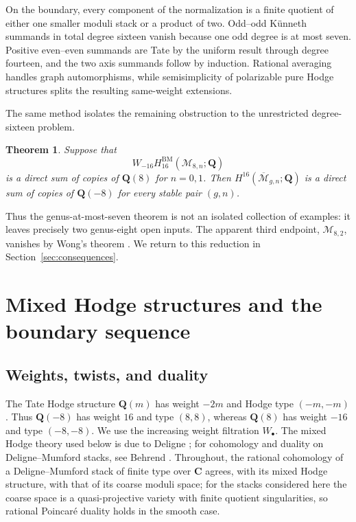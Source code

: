 \documentclass[12pt,reqno]{amsart}
\newcommand{\Q}{\mathbf{Q}}
\newcommand{\C}{\mathbf{C}}
\newcommand{\M}{\mathcal{M}}
\newcommand{\Mbar}{\overline{\mathcal{M}}}
\newcommand{\BM}{\mathrm{BM}}
\newtheorem{theorem}{Theorem}[section]
\theoremstyle{definition}
\theoremstyle{remark}
\begin{document}
On the boundary, every component of the normalization is a finite quotient
of either one smaller moduli stack or a product of two.  Odd--odd K\"unneth
summands in total degree sixteen vanish because one odd degree is at most
seven.  Positive even--even summands are Tate by the uniform result through
degree fourteen, and the two axis summands follow by induction.  Rational
averaging handles graph automorphisms, while semisimplicity of polarizable
pure Hodge structures splits the resulting same-weight extensions.

The same method isolates the remaining obstruction to the unrestricted
degree-sixteen problem.

\begin{theorem}\label{thm:reduction-intro}
Suppose that
\[
 W_{-16}H^{\BM}_{16}(\M_{8,n};\Q)
\]
is a direct sum of copies of $\Q(8)$ for $n=0,1$.  Then
$H^{16}(\Mbar_{g,n};\Q)$ is a direct sum of copies of $\Q(-8)$ for every
stable pair $(g,n)$.
\end{theorem}

Thus the genus-at-most-seven theorem is not an isolated collection of
examples: it leaves precisely two genus-eight open inputs.  The apparent
third endpoint, $\M_{8,2}$, vanishes by Wong's theorem
\cite[Theorem~4.1]{Wong}.  We return to this reduction in
Section~\ref{sec:consequences}.

\section{Mixed Hodge structures and the boundary sequence}
\label{sec:boundary}

\subsection{Weights, twists, and duality}

The Tate Hodge structure $\Q(m)$ has weight $-2m$ and Hodge type
$(-m,-m)$.  Thus $\Q(-8)$ has weight $16$ and type $(8,8)$, whereas
$\Q(8)$ has weight $-16$ and type $(-8,-8)$.  We use the increasing weight
filtration $W_\bullet$.  The mixed Hodge theory used below is due to Deligne
\cite{DeligneHodgeII,DeligneHodgeIII}; for cohomology and duality on
Deligne--Mumford stacks, see Behrend \cite{BehrendStacks}.  Throughout, the
rational cohomology of a Deligne--Mumford stack of finite type over $\C$
agrees, with its mixed Hodge structure, with that of its coarse moduli
space; for the stacks considered here the coarse space is a quasi-projective
variety with finite quotient singularities, so rational Poincar\'e duality
holds in the smooth case.
\end{document}

